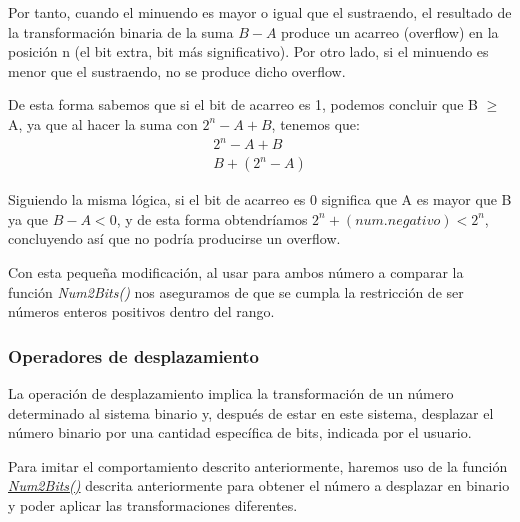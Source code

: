 \documentclass[a4paper,12pt]{report}
\begin{document}
	\vspace{0.2cm}
	
	\noindent Por tanto, cuando el minuendo es mayor o igual que el sustraendo, el resultado de la transformación binaria de la suma $B-A$ produce un acarreo (overflow) en la posición n (el bit extra, bit más significativo). Por otro lado, si el minuendo es menor que el sustraendo, no se produce dicho overflow.
	
	\vspace{0.2cm}
	
	\noindent De esta forma sabemos que si el bit de acarreo es 1, podemos concluir que B $\geq$ A, ya que al hacer la suma con $2^n -  A + B$, tenemos que:
	\begin{equation}
		\begin{aligned}
			2^n - A + B \\
			B + (2^n - A)
		\end{aligned}
	\end{equation}
	\vspace{0.2cm}
	
	\noindent Siguiendo la misma lógica, si el bit de acarreo es 0 significa que A es mayor que B ya que $B - A < 0$, y de esta forma obtendríamos $2^n + (num. negativo) < 2^n$, concluyendo así que no podría producirse un overflow.
	
	
	\vspace{0.2cm}    
	\noindent Con esta pequeña modificación, al usar para ambos número a comparar la función \textit{Num2Bits()} nos aseguramos de que se cumpla la restricción de ser números enteros positivos dentro del rango.
	
	
	
	\subsubsection{Operadores de desplazamiento}
	
	\noindent La operación de desplazamiento implica la transformación de un número determinado al sistema binario y, después de estar en este sistema, desplazar el número binario por una cantidad específica de bits, indicada por el usuario.
	
	\vspace{0.2cm}
	\noindent Para imitar el comportamiento descrito anteriormente, haremos uso de la función \hyperref[cod:num2bits]{\textit{Num2Bits()}} descrita anteriormente para obtener el número a desplazar en binario y poder aplicar las transformaciones diferentes.
	
\end{document}
